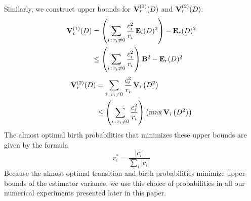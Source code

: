 \documentclass[a4paper,11pt]{article}
\theoremstyle{remark}
\theoremstyle{definition}
\begin{document}
        Similarly, we construct upper bounds for ${\bf V}_r^{(1)}(D)$ and
        ${\bf V}_r^{(2)}(D)$:
        \[ \begin{split}
            {\bf V}_r^{(1)}(D)
            &= \left(\sum_{i\,:\,r_i\ne0} \frac{c_i^2}{r_i}\,
                     {\bf E}_i(D)^2\right) - {\bf E}_r(D)^2 \\
            &\le \left( \sum_{i\,:\,r_i\ne0} \frac{c_i^2}{r_i}\right)
                 \mathbf{B}^2 - {\bf E}_r(D)^2
        \end{split} \]
        \[ \begin{split}
            {\bf V}_r^{(2)}(D) &= 
                \sum_{i\,:\,r_i\ne0} \frac{c_i^2}{r_i}\,
                {\bf V}_i\left(D^2\right)  \\
            &\le \left( \sum_{i\,:\,r_i\ne0} \frac{c_i^2}{r_i}\right)
                \left(\max {\bf V}_i\left(D^2\right)\right)
        \end{split} \]
        The almost optimal birth probabilities that minimizes these upper
        bounds are given by the formula
        \begin{equation} \label{birth}
            r_i^* = \frac{|c_i|}{\sum_i|c_i|}
        \end{equation}
        Because the almost optimal transition and birth probabilities
        minimize upper bounds of the estimator variance, we use this
        choice of probabilities in all our numerical experiments presented
        later in this paper.

    
\end{document}
